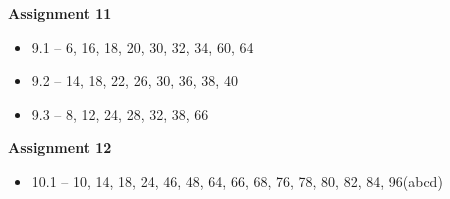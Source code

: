 \documentclass[12pt]{letter}
\newcommand{\?}{\stackrel{?}{=}}
\begin{document}
	\textbf{Assignment 11} \begin{itemize} \vspace{-12pt}
		\item 9.1 -- 6, 16, 18, 20, 30, 32, 34, 60, 64
		\item 9.2 -- 14, 18, 22, 26, 30, 36, 38, 40
		\item 9.3 -- 8, 12, 24, 28, 32, 38, 66
	\end{itemize}

	\textbf{Assignment 12} \begin{itemize} \vspace{-12pt}
		\item 10.1 -- 10, 14, 18, 24, 46, 48, 64, 66, 68, 76, 78, 80, 82, 84, 96(abcd)
	\end{itemize}
	
\end{document}
